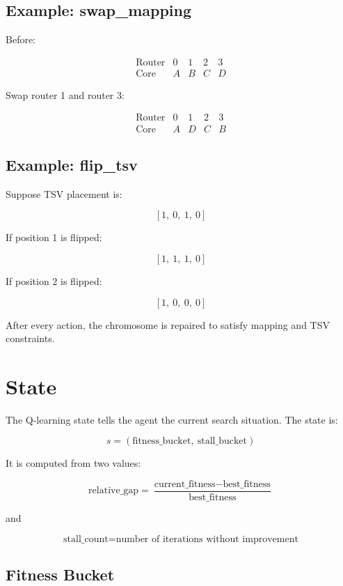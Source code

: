 \documentclass[11pt]{article}
\begin{document}
\subsection{Example: swap\_mapping}

Before:

\[
\begin{array}{c|cccc}
\text{Router} & 0 & 1 & 2 & 3 \\
\hline
\text{Core} & A & B & C & D
\end{array}
\]

Swap router 1 and router 3:

\[
\begin{array}{c|cccc}
\text{Router} & 0 & 1 & 2 & 3 \\
\hline
\text{Core} & A & D & C & B
\end{array}
\]

\subsection{Example: flip\_tsv}

Suppose TSV placement is:

\[
[1,\ 0,\ 1,\ 0]
\]

If position 1 is flipped:

\[
[1,\ 1,\ 1,\ 0]
\]

If position 2 is flipped:

\[
[1,\ 0,\ 0,\ 0]
\]

After every action, the chromosome is repaired to satisfy mapping and TSV
constraints.

\section{State}

The Q-learning state tells the agent the current search situation. The state is:

\[
s = (\text{fitness\_bucket},\ \text{stall\_bucket})
\]

It is computed from two values:

\[
\text{relative\_gap}
=
\frac{\text{current\_fitness} - \text{best\_fitness}}
{\text{best\_fitness}}
\]

and

\[
\text{stall\_count}
=
\text{number of iterations without improvement}
\]

\subsection{Fitness Bucket}
\end{document}
